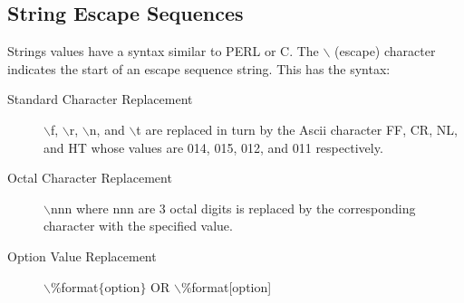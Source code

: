 \documentclass[a4paper]{article}
\begin{document}
\subsection{String Escape Sequences
\label{stringescape}}

Strings values have a syntax similar to PERL or C.
The {\ttfamily $\backslash$} (escape) character indicates the start of an escape sequence string.
This has the syntax:
\begin{description}
\item[Standard Character Replacement] \mbox{}

{\ttfamily $\backslash$f},
{\ttfamily $\backslash$r},
{\ttfamily $\backslash$n},
and
{\ttfamily $\backslash$t}
are replaced in turn by the Ascii character FF, CR, NL,
and HT whose values are 014, 015, 012, and 011 respectively.

\item[Octal Character Replacement] \mbox{}

{\ttfamily $\backslash$nnn}
where nnn are 3 octal digits is replaced by the corresponding character
with the specified value.

\item[Option Value Replacement] \mbox{}

{\ttfamily $\backslash$\%format$\{$option$\}$  OR  $\backslash$\%format{[}option{]}}


\end{description}
\end{document}
